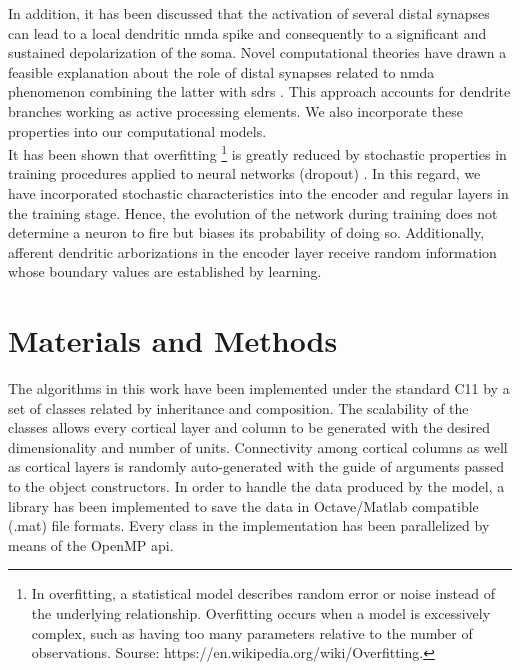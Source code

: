 \documentclass[11pt,a4paper]{article}
\newcommand{\CC}{C\nolinebreak\hspace{-.05em}\raisebox{.4ex}{\tiny\bf +}\nolinebreak\hspace{-.10em}\raisebox{.4ex}{\tiny\bf +}}
\begin{document}
In addition, it has been discussed  %
that the activation of several distal
synapses can lead to a local dendritic \gls{nmda}
spike and consequently to a significant
and sustained depolarization of the soma.
Novel computational theories have drawn a feasible explanation
about the role of distal synapses related to \gls{nmda}
phenomenon \cite{hawkins_2016}
combining the latter with \glspl{sdr} \cite{ahmad_2016}.
This approach accounts for dendrite branches working as active processing elements.
We also incorporate these properties into our computational models. \\

It has been shown that overfitting
\footnote{In overfitting, a statistical model describes random error or noise instead of the underlying relationship. %
Overfitting occurs when a model is excessively complex, such as having too many parameters relative to the number of observations. %
Sourse: https://en.wikipedia.org/wiki/Overfitting.}
is greatly reduced by
stochastic properties in training procedures
applied to neural networks (dropout) \cite{JMLR:v15:srivastava14a}.
In this regard, we have incorporated stochastic characteristics into
the encoder and regular layers in the training stage.
Hence, the evolution of the network during training does not
determine a neuron to fire but biases its probability
of doing so. Additionally, afferent dendritic arborizations
in the encoder layer receive random information whose
boundary values are established by learning. \\












\section{Materials and Methods}

The algorithms in this work have been implemented under the standard \CC11 by a set of
classes related by inheritance and composition.
The scalability of the classes allows every cortical layer and column to be generated
with the desired dimensionality and number of units. Connectivity among cortical columns as well as
cortical layers is randomly auto-generated with the guide of arguments passed to the
object constructors. In order to handle the data produced by the model,
a library has been implemented to save the data in Octave/Matlab compatible (.mat) file formats.
Every class in the implementation has been parallelized by means of the OpenMP \gls{api}. \\
\end{document}
